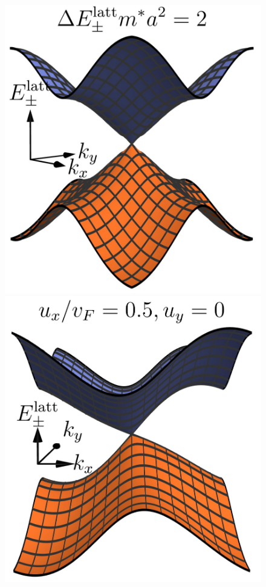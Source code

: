 \documentclass[submission, Phys]{SciPost}
\begin{document}
\begin{figure}[ht]
    \includegraphics{fig/lattice_dispersion_1.jpg}
    \includegraphics{fig/lattice_dispersion_4.jpg}

\end{figure}
\end{document}
